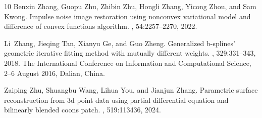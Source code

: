 \documentclass[11pt]{article}
\numberwithin{equation}{section}
\begin{document}
\begin{thebibliography}{10}
Benxin Zhang, Guopu Zhu, Zhibin Zhu, Hongli Zhang, Yicong Zhou, and Sam Kwong.
\newblock Impulse noise image restoration using nonconvex variational model and difference of convex functions algorithm.
, 54:2257--2270, 2022.

Li~Zhang, Jieqing Tan, Xianyu Ge, and Guo Zheng.
\newblock Generalized b-splines’ geometric iterative fitting method with mutually different weights.
, 329:331--343, 2018.
\newblock The International Conference on Information and Computational Science, 2--6 August 2016, Dalian, China.

Zaiping Zhu, Shuangbu Wang, Lihua You, and Jianjun Zhang.
\newblock Parametric surface reconstruction from 3d point data using partial differential equation and bilinearly blended coons patch.
, 519:113436, 2024.

\end{thebibliography}
\end{document}
